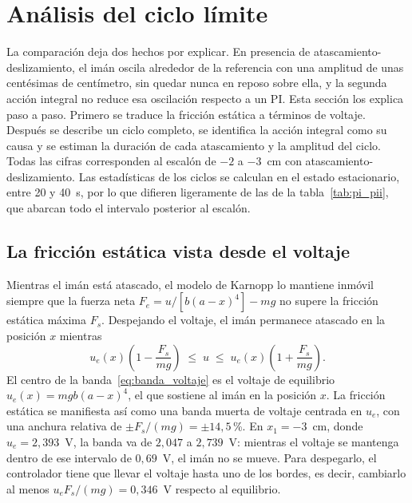 \section{Análisis del ciclo límite}
\label{sec:analisis_ciclo}

La comparación deja dos hechos por explicar. En presencia de atascamiento-deslizamiento, el imán oscila alrededor de la referencia con una amplitud de unas centésimas de centímetro, sin quedar nunca en reposo sobre ella, y la segunda acción integral no reduce esa oscilación respecto a un PI. Esta sección los explica paso a paso. Primero se traduce la fricción estática a términos de voltaje. Después se describe un ciclo completo, se identifica la acción integral como su causa y se estiman la duración de cada atascamiento y la amplitud del ciclo. Todas las cifras corresponden al escalón de $-2$ a $-3$~cm con atascamiento-deslizamiento. Las estadísticas de los ciclos se calculan en el estado estacionario, entre 20 y 40~s, por lo que difieren ligeramente de las de la tabla~\ref{tab:pi_pii}, que abarcan todo el intervalo posterior al escalón.

\subsection{La fricción estática vista desde el voltaje}

Mientras el imán está atascado, el modelo de Karnopp lo mantiene inmóvil siempre que la fuerza neta $F_e = u/[b(a-x)^4] - mg$ no supere la fricción estática máxima $F_s$. Despejando el voltaje, el imán permanece atascado en la posición $x$ mientras
\begin{equation}
u_e(x)\left(1-\frac{F_s}{mg}\right) \;\le\; u \;\le\; u_e(x)\left(1+\frac{F_s}{mg}\right) .
\label{eq:banda_voltaje}
\end{equation}
El centro de la banda~\eqref{eq:banda_voltaje} es el voltaje de equilibrio $u_e(x)=mgb(a-x)^4$, el que sostiene al imán en la posición $x$. La fricción estática se manifiesta así como una banda muerta de voltaje centrada en $u_e$, con una anchura relativa de $\pm F_s/(mg)=\pm14{,}5$\,\%. En $x_1=-3$~cm, donde $u_e=2{,}393$~V, la banda va de $2{,}047$ a $2{,}739$~V: mientras el voltaje se mantenga dentro de ese intervalo de $0{,}69$~V, el imán no se mueve. Para despegarlo, el controlador tiene que llevar el voltaje hasta uno de los bordes, es decir, cambiarlo al menos $u_e F_s/(mg)=0{,}346$~V respecto al equilibrio.

